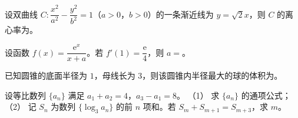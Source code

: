 \begin{question}
设双曲线 $C:\dfrac{x^2}{a^2}-\dfrac{y^2}{b^2}=1$（$a>0$，$b>0$）的一条渐近线为 $y=\sqrt2x$，则 $C$ 的离心率为\gkblank{}。
\end{question}
\begin{question}
设函数 $f(x)=\dfrac{\mathrm e^x}{x+a}$。若 $f'(1)=\dfrac{\mathrm e}4$，则 $a=$\gkblank{}。
\end{question}
\begin{question}
已知圆锥的底面半径为 $1$，母线长为 $3$，则该圆锥内半径最大的球的体积为\gkblank{}。
\end{question}
\begin{question}
设等比数列 $\{a_n\}$ 满足 $a_1+a_2=4$，$a_3-a_1=8$。
（1） 求 $\{a_n\}$ 的通项公式；
（2） 记 $S_n$ 为数列 $\{\log_3a_n\}$ 的前 $n$ 项和。若 $S_m+S_{m+1}=S_{m+3}$，求 $m$。
\end{question}
